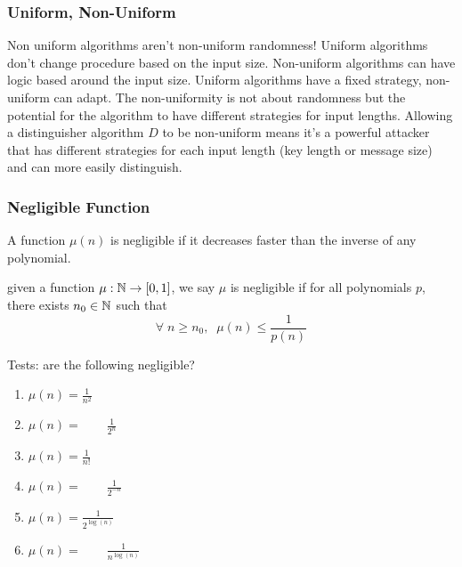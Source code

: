 \subsubsection*{Uniform, Non-Uniform}
Non uniform algorithms aren't non-uniform randomness! 
Uniform algorithms don't change procedure based on the input size. Non-uniform algorithms can have logic based around the input size.
Uniform algorithms have a fixed strategy, non-uniform can adapt. 
The non-uniformity is not about randomness but the potential for the algorithm to have different strategies for input lengths.
Allowing a distinguisher algorithm $D$ to be non-uniform means it's a powerful attacker that has different strategies for each input length (key length or message size) and can more easily distinguish.

\subsubsection*{Negligible Function}
A function $\mu(n)$ is negligible if it decreases faster than the inverse of any polynomial.
\begin{definition}
    given a function $\mu : \mathbb{N} \to [0,1]$, we say $\mu$ is negligible if for all polynomials $p$, there exists $n_0 \in \mathbb{N}$ such that 
$$
    \forall \; n \geq n_0,\;   \; \mu(n) \leq \frac{1}{p(n)}
$$
\end{definition}
Tests: are the following negligible?
\begin{enumerate}
    \item $\mu(n) = \frac{1}{n^2}$
    \item $\mu(n) = \qquad \frac{1}{2^n}$ 
    \item $\mu(n) = \frac{1}{n!}$ 
    \item $\mu(n) = \qquad \frac{1}{2^{-n}}$ 
    \item $\mu(n) = \frac{1}{2^{\log(n)}}$ 
    \item $\mu(n) = \qquad \frac{1}{n^{\log(n)}}$ 
\end{enumerate}

